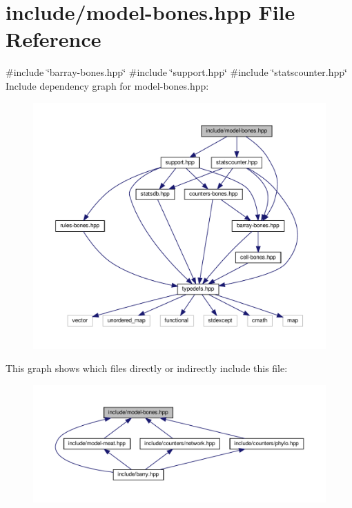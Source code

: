 \hypertarget{model-bones_8hpp}{}\section{include/model-\/bones.hpp File Reference}
\label{model-bones_8hpp}
{\ttfamily \#include \char`\"{}barray-\/bones.\+hpp\char`\"{}}\newline
{\ttfamily \#include \char`\"{}support.\+hpp\char`\"{}}\newline
{\ttfamily \#include \char`\"{}statscounter.\+hpp\char`\"{}}\newline
Include dependency graph for model-\/bones.hpp\+:
\nopagebreak
\begin{figure}[H]
\begin{center}
\leavevmode
\includegraphics[width=350pt]{model-bones_8hpp__incl}
\end{center}
\end{figure}
This graph shows which files directly or indirectly include this file\+:
\nopagebreak
\begin{figure}[H]
\begin{center}
\leavevmode
\includegraphics[width=350pt]{model-bones_8hpp__dep__incl}
\end{center}
\end{figure}

